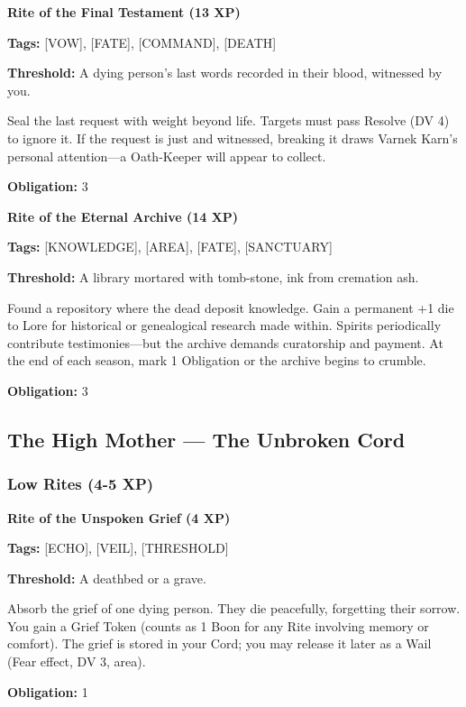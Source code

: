 \textbf{Rite of the Final Testament (13 XP)}

\textbf{Tags:} [VOW], [FATE], [COMMAND], [DEATH]

\textbf{Threshold:} A dying person's last words recorded in their blood, witnessed by you.

Seal the last request with weight beyond life. Targets must pass Resolve (DV 4) to ignore it. If the request is just and witnessed, breaking it draws Varnek Karn's personal attention—a Oath-Keeper will appear to collect.

\textbf{Obligation:} 3

\vspace{0.5em}

\textbf{Rite of the Eternal Archive (14 XP)}

\textbf{Tags:} [KNOWLEDGE], [AREA], [FATE], [SANCTUARY]

\textbf{Threshold:} A library mortared with tomb-stone, ink from cremation ash.

Found a repository where the dead deposit knowledge. Gain a permanent +1 die to Lore for historical or genealogical research made within. Spirits periodically contribute testimonies—but the archive demands curatorship and payment. At the end of each season, mark 1 Obligation or the archive begins to crumble.

\textbf{Obligation:} 3

\subsection{The High Mother — The Unbroken Cord}

\subsubsection{Low Rites (4-5 XP)}

\textbf{Rite of the Unspoken Grief (4 XP)}

\textbf{Tags:} [ECHO], [VEIL], [THRESHOLD]

\textbf{Threshold:} A deathbed or a grave.

Absorb the grief of one dying person. They die peacefully, forgetting their sorrow. You gain a Grief Token (counts as 1 Boon for any Rite involving memory or comfort). The grief is stored in your Cord; you may release it later as a Wail (Fear effect, DV 3, area).

\textbf{Obligation:} 1

\vspace{0.5em}

